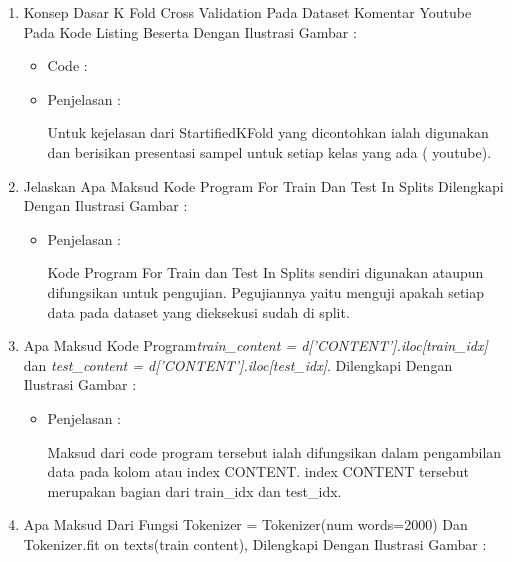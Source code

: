 \begin{enumerate}
\par
\par
\item Konsep Dasar K Fold Cross Validation Pada Dataset Komentar Youtube Pada Kode Listing Beserta Dengan Ilustrasi Gambar :
\begin{itemize}
\item Code		:

\item Penjelasan	: 
\par Untuk kejelasan dari StartifiedKFold yang dicontohkan ialah digunakan dan berisikan presentasi sampel untuk setiap kelas yang ada ( youtube).
\par
\end{itemize}
\par
\par
\par
\item Jelaskan Apa Maksud Kode Program For Train Dan Test In Splits Dilengkapi Dengan Ilustrasi Gambar :
\begin{itemize}
\item Penjelasan	:
\par Kode Program For Train dan Test In Splits sendiri digunakan ataupun difungsikan untuk pengujian. Pegujiannya yaitu menguji apakah setiap data pada dataset yang dieksekusi sudah di split.
\par 
\par
\end{itemize}
\par
\item Apa Maksud Kode Program\emph{train\_content = d['CONTENT'].iloc[train\_idx]} dan \emph{test\_content = d['CONTENT'].iloc[test\_idx]}. Dilengkapi Dengan Ilustrasi Gambar :
\begin{itemize}
\item Penjelasan	:
\par Maksud dari code program tersebut ialah difungsikan dalam pengambilan data pada kolom atau index CONTENT. index CONTENT tersebut merupakan bagian dari train\_idx dan test\_idx.
\par
\par
\end{itemize}
\par
\item Apa Maksud Dari Fungsi Tokenizer = Tokenizer(num words=2000) Dan Tokenizer.fit on texts(train content), Dilengkapi Dengan Ilustrasi Gambar :
\begin{itemize}

\end{itemize}
\end{enumerate}
